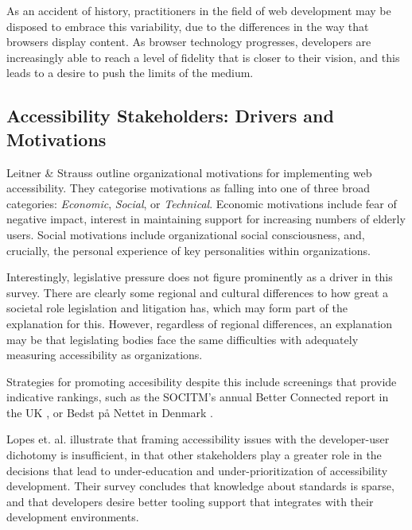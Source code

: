 As an accident of history, practitioners in the field of web development may be disposed to embrace this variability, due to the differences in the way that browsers display content. As browser technology progresses, developers are increasingly able to reach a level of fidelity that is closer to their vision, and this leads to a desire to push the limits of the medium.


\subsection{Accessibility Stakeholders: Drivers and Motivations} %
\label{sub:stakeholders}

Leitner \& Strauss \cite{Leitner:2010} outline organizational motivations for implementing web accessibility. They categorise motivations as falling into one of three broad categories: \emph{Economic}, \emph{Social}, or \emph{Technical}. Economic motivations include fear of negative impact, interest in maintaining support for increasing numbers of elderly users. Social motivations include organizational social consciousness, and, crucially, the personal experience of key personalities within organizations.

Interestingly, legislative pressure does not figure prominently as a driver in this survey. There are clearly some regional and cultural differences to how great a societal role legislation and litigation has, which may form part of the explanation for this. However, regardless of regional differences, an explanation may be that legislating bodies face the same difficulties with adequately measuring accessibility as organizations. 

Strategies for promoting accesibility despite this include screenings that provide indicative rankings, such as the \ac{SOCITM}'s annual Better Connected report in the UK \cite{betterconnected:2013}, or Bedst p\aa{} Nettet in Denmark \cite{bedstpaanettet:2013}.

Lopes et. al. \cite{Lopes:2010} illustrate that framing accessibility issues with the developer-user dichotomy is insufficient, in that other stakeholders play a greater role in the decisions that lead to under-education and under-prioritization of accessibility development. Their survey concludes that knowledge about standards is sparse, and that developers desire better tooling support that integrates with their development environments.

